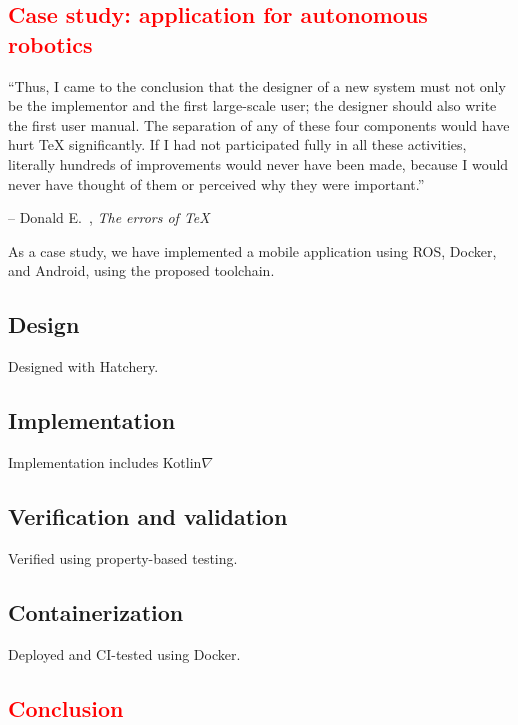 \documentclass[12pt,initial,twoside,maitrise]{dms}
\newcommand{\rare}[1]{\textcolor{red}{#1}}
\numberwithin{equation}{section}
\numberwithin{table}{chapter}
\numberwithin{figure}{chapter}
\begin{document}
\rare{\chapter{Case study: application for autonomous robotics}\label{ch:case-study}}

\setlength{\epigraphwidth}{0.80\textwidth}
\epigraph{``Thus, I came to the conclusion that the designer of a new system must not only be the implementor and the first large-scale user; the designer should also write the first user manual. The separation of any of these four components would have hurt TeX significantly. If I had not participated fully in all these activities, literally hundreds of improvements would never have been made, because I would never have thought of them or perceived why they were important.''}{\begin{flushright}-- Donald E.~\citet{knutherrors}, \textit{The errors of TeX}\end{flushright}}

As a case study, we have implemented a mobile application using ROS, Docker, and Android, using the proposed toolchain.

\section{Design}

Designed with Hatchery.

\section{Implementation}

Implementation includes Kotlin$\nabla$

\section{Verification and validation}

Verified using property-based testing.

\section{Containerization}

Deployed and CI-tested using Docker.

\rare{\chapter{Conclusion}\label{ch:conclusion}}
\end{document}
